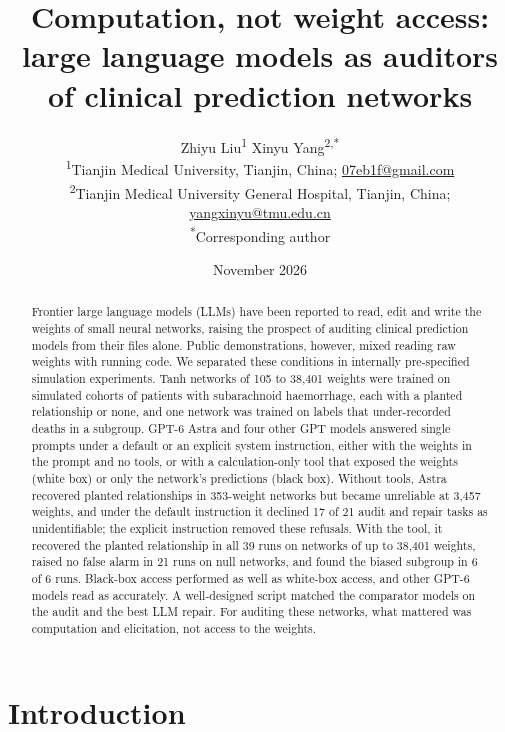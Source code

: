 \documentclass[11pt]{article}
\title{Computation, not weight access: large language models as auditors of clinical prediction networks}
\author{Zhiyu Liu\textsuperscript{1} \qquad Xinyu Yang\textsuperscript{2,*}\\[6pt]
{\small \textsuperscript{1}Tianjin Medical University, Tianjin, China; \href{mailto:07eb1f@gmail.com}{07eb1f@gmail.com}}\\
{\small \textsuperscript{2}Tianjin Medical University General Hospital, Tianjin, China; \href{mailto:yangxinyu@tmu.edu.cn}{yangxinyu@tmu.edu.cn}}\\
{\small \textsuperscript{*}Corresponding author}}
\date{November 2026}
\newcommand{\astra}{GPT-6 Astra}
\begin{document}
\maketitle

\begin{abstract}
\noindent Frontier large language models (LLMs) have been reported to read, edit and write the weights of small neural networks, raising the prospect of auditing clinical prediction models from their files alone. Public demonstrations, however, mixed reading raw weights with running code. We separated these conditions in internally pre-specified simulation experiments. Tanh networks of 105 to 38,401 weights were trained on simulated cohorts of patients with subarachnoid haemorrhage, each with a planted relationship or none, and one network was trained on labels that under-recorded deaths in a subgroup. \astra{} and four other GPT models answered single prompts under a default or an explicit system instruction, either with the weights in the prompt and no tools, or with a calculation-only tool that exposed the weights (white box) or only the network's predictions (black box). Without tools, Astra recovered planted relationships in 353-weight networks but became unreliable at 3,457 weights, and under the default instruction it declined 17 of 21 audit and repair tasks as unidentifiable; the explicit instruction removed these refusals. With the tool, it recovered the planted relationship in all 39 runs on networks of up to 38,401 weights, raised no false alarm in 21 runs on null networks, and found the biased subgroup in 6 of 6 runs. Black-box access performed as well as white-box access, and other GPT-6 models read as accurately. A well-designed script matched the comparator models on the audit and the best LLM repair. For auditing these networks, what mattered was computation and elicitation, not access to the weights.
\end{abstract}

\section{Introduction}
\end{document}
